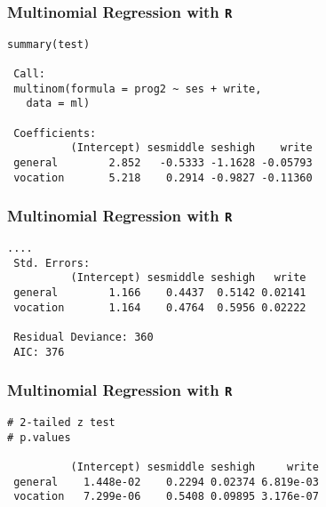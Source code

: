 \documentclass[00-GLMregslides.tex]{subfiles}
\begin{document}
\begin{frame}[fragile]

\frametitle{Multinomial Regression with \texttt{R}}
\large

	\begin{verbatim}
summary(test)
 
 Call:
 multinom(formula = prog2 ~ ses + write, 
   data = ml)
 
 Coefficients:
          (Intercept) sesmiddle seshigh    write
 general        2.852   -0.5333 -1.1628 -0.05793
 vocation       5.218    0.2914 -0.9827 -0.11360
\end{verbatim}

\end{frame}

\begin{frame}[fragile]

\frametitle{Multinomial Regression with \texttt{R}}
\large

\begin{verbatim}
....
 Std. Errors:
          (Intercept) sesmiddle seshigh   write
 general        1.166    0.4437  0.5142 0.02141
 vocation       1.164    0.4764  0.5956 0.02222
 
 Residual Deviance: 360 
 AIC: 376
\end{verbatim}

\end{frame}
%
% 
%
\begin{frame}[fragile]

\frametitle{Multinomial Regression with \texttt{R}}
\large

\begin{verbatim}
# 2-tailed z test
# p.values
 
          (Intercept) sesmiddle seshigh     write
 general    1.448e-02    0.2294 0.02374 6.819e-03
 vocation   7.299e-06    0.5408 0.09895 3.176e-07
\end{verbatim}

\end{frame}
\end{document}
